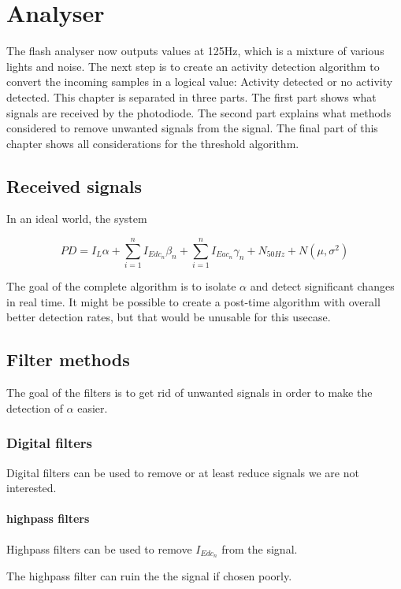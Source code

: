 \chapter{Analyser}
\label{chp:Analyser}
The flash analyser now outputs values at 125Hz, which is a mixture of various lights and noise. The next step is to create an activity detection algorithm to convert the incoming samples in a logical value: Activity detected or no activity detected. This chapter is separated in three parts. The first part shows what signals are received by the photodiode. The second part explains what methods considered to remove unwanted signals from the signal. The final part of this chapter shows all considerations for the threshold algorithm.

\section{Received signals}
In an ideal world, the system 


\begin{equation}
\label{eq:Pd_light}
PD = I_{L} \alpha + \sum_{i=1}^n I_{Edc_{n}} \beta_{n} + \sum_{i=1}^n I_{Eac{_n}} \gamma_{n} + N_{50Hz} + N(\mu,\sigma^2)
\end{equation}

The goal of the complete algorithm is to isolate $\alpha$ and detect significant changes in real time. It might be possible to create a post-time algorithm with overall better detection rates, but that would be unusable for this usecase.

\section{Filter methods}
The goal of the filters is to get rid of unwanted signals in order to make the detection of $\alpha$ easier.

\subsection{Digital filters}
Digital filters can be used to remove or at least reduce signals we are not interested.

\subsubsection{highpass filters}
Highpass filters can be used to remove $I_{Edc_{n}}$ from the signal.

The highpass filter can ruin the the signal if chosen poorly.

